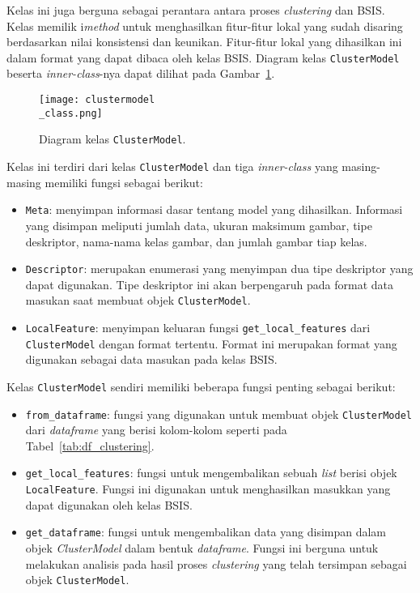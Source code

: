 Kelas ini juga berguna sebagai perantara antara proses \textit{clustering} dan BSIS. Kelas memilik i\textit{method} untuk menghasilkan fitur-fitur lokal yang sudah disaring berdasarkan nilai konsistensi dan keunikan. Fitur-fitur lokal yang dihasilkan ini dalam format yang dapat dibaca oleh kelas BSIS. Diagram kelas \texttt{ClusterModel} beserta \textit{inner-class}-nya dapat dilihat pada Gambar~\ref{fig:clustermodel_class}.
\begin{figure}[H]
	\centering
	\texttt{[image: clustermodel\\\_class.png]}
	\caption{Diagram kelas \texttt{ClusterModel}.}
	\label{fig:clustermodel_class}
\end{figure}
Kelas ini terdiri dari kelas \texttt{ClusterModel} dan tiga \textit{inner-class} yang masing-masing memiliki fungsi sebagai berikut:
\begin{itemize}
	\item \texttt{Meta}: menyimpan informasi dasar tentang model yang dihasilkan. Informasi yang disimpan meliputi jumlah data, ukuran maksimum gambar, tipe deskriptor, nama-nama kelas gambar, dan jumlah gambar tiap kelas. 
	\item \texttt{Descriptor}: merupakan enumerasi yang menyimpan dua tipe deskriptor yang dapat digunakan. Tipe deskriptor ini akan berpengaruh pada format data masukan saat membuat objek \texttt{ClusterModel}.
	\item \texttt{LocalFeature}: menyimpan keluaran fungsi \texttt{get\_local\_features} dari  \texttt{ClusterModel} dengan format tertentu. Format ini merupakan format yang digunakan sebagai data masukan pada kelas BSIS.
\end{itemize}
Kelas \texttt{ClusterModel} sendiri memiliki beberapa fungsi penting sebagai berikut:
\begin{itemize}
	\item \texttt{from\_dataframe}: fungsi yang digunakan untuk membuat objek \texttt{ClusterModel} dari \textit{dataframe} yang berisi kolom-kolom seperti pada Tabel~\ref{tab:df_clustering}.
	\item \texttt{get\_local\_features}: fungsi untuk mengembalikan sebuah \textit{list} berisi objek \texttt{LocalFeature}. Fungsi ini digunakan untuk menghasilkan masukkan yang dapat digunakan oleh kelas BSIS.
	\item \texttt{get\_dataframe}: fungsi untuk mengembalikan data yang disimpan dalam objek \textit{ClusterModel} dalam bentuk \textit{dataframe}. Fungsi ini berguna untuk melakukan analisis pada hasil proses \textit{clustering} yang telah tersimpan sebagai objek \texttt{ClusterModel}.
\end{itemize}


